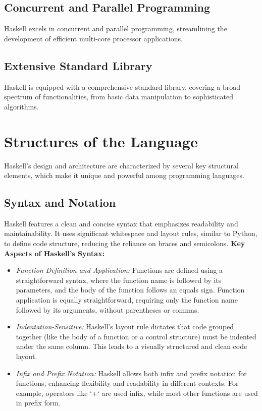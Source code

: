 \documentclass[a4paper, 10pt]{article}
\begin{document}
        \subsection{Concurrent and Parallel Programming}
            Haskell excels in concurrent and parallel programming, streamlining the development of efficient multi-core processor applications.

        \subsection{Extensive Standard Library}
            Haskell is equipped with a comprehensive standard library, covering a broad spectrum of functionalities, from basic data manipulation to sophisticated algorithms.

        \pagebreak

	\section{Structures of the Language}
        Haskell's design and architecture are characterized by several key structural elements, which make it unique and powerful among programming languages.

        \subsection{Syntax and Notation}
            Haskell features a clean and concise syntax that emphasizes readability and maintainability. It uses significant whitespace and layout rules, similar to Python, to define code structure, reducing the reliance on braces and semicolons.
            \textbf{Key Aspects of Haskell's Syntax:}
            \begin{itemize}
                \item \textit{Function Definition and Application:} Functions are defined using a straightforward syntax, where the function name is followed by its parameters, and the body of the function follows an equals sign. Function application is equally straightforward, requiring only the function name followed by its arguments, without parentheses or commas.
                \item \textit{Indentation-Sensitive:} Haskell's layout rule dictates that code grouped together (like the body of a function or a control structure) must be indented under the same column. This leads to a visually structured and clean code layout.
                \item \textit{Infix and Prefix Notation:} Haskell allows both infix and prefix notation for functions, enhancing flexibility and readability in different contexts. For example, operators like `+` are used infix, while most other functions are used in prefix form.
            \end{itemize}
\end{document}
